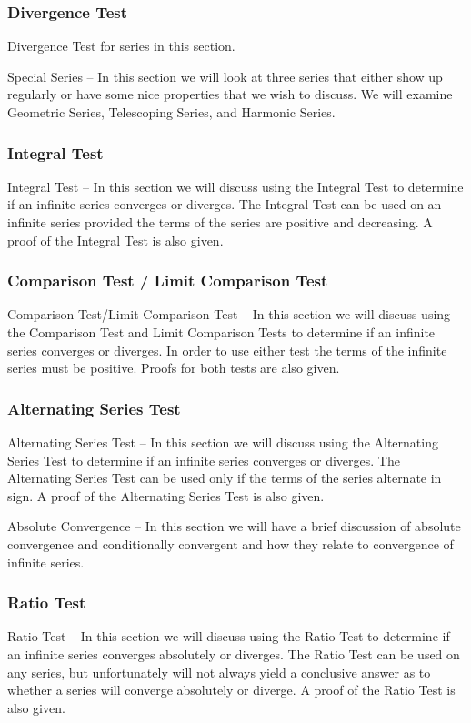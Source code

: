 \subsubsection{Divergence Test}
Divergence Test for series in this section.

Special Series – In this section we will look at three series that either show up regularly or have some nice properties that we wish to discuss. We will examine Geometric Series, Telescoping Series, and Harmonic Series.

\subsubsection{Integral Test}

Integral Test – In this section we will discuss using the Integral Test to determine if an infinite series converges or diverges. The Integral Test can be used on an infinite series provided the terms of the series are positive and decreasing. A proof of the Integral Test is also given.

\subsubsection{Comparison Test / Limit Comparison Test}

Comparison Test/Limit Comparison Test – In this section we will discuss using the Comparison Test and Limit Comparison Tests to determine if an infinite series converges or diverges. In order to use either test the terms of the infinite series must be positive. Proofs for both tests are also given.

\subsubsection{Alternating Series Test}
Alternating Series Test – In this section we will discuss using the Alternating Series Test to determine if an infinite series converges or diverges. The Alternating Series Test can be used only if the terms of the series alternate in sign. A proof of the Alternating Series Test is also given.

Absolute Convergence – In this section we will have a brief discussion of absolute convergence and conditionally convergent and how they relate to convergence of infinite series.

\subsubsection{Ratio Test}
Ratio Test – In this section we will discuss using the Ratio Test to determine if an infinite series converges absolutely or diverges. The Ratio Test can be used on any series, but unfortunately will not always yield a conclusive answer as to whether a series will converge absolutely or diverge. A proof of the Ratio Test is also given.

